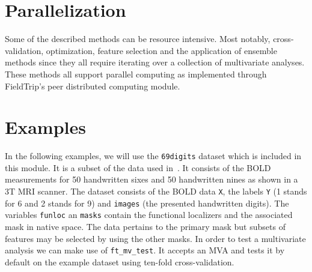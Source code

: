 \documentclass{article}
\renewcommand{\t}[1]{{\tt #1}}
\begin{document}
\section{Parallelization}
\label{parallel}

Some of the described methods can be resource intensive. Most notably, cross-validation, optimization, feature selection and the application of ensemble methods since they all require iterating over a collection of multivariate analyses. These methods all support parallel computing as implemented through FieldTrip's peer distributed computing module.


\section{Examples}
\label{examples}

In the following examples, we will use the \t{69digits} dataset which is included in this module. It is a subset of the data used in~\cite{gerven2010,gerven2010a}. It consists of the BOLD measurements for 50 handwritten sixes and 50 handwritten nines as shown in a 3T MRI scanner. The dataset consists of the BOLD data \t{X}, the labels \t{Y} (1 stands for 6 and 2 stands for 9) and \t{images} (the presented handwritten digits). The variables \t{funloc} an \t{masks} contain the functional localizers and the associated mask in native space. The data pertains to the primary mask but subsets of features may be selected by using the other masks. In order to test a multivariate analysis we can make use of \t{ft\_mv\_test}. It accepts an MVA and tests it by default on the example dataset using ten-fold cross-validation.
\end{document}
